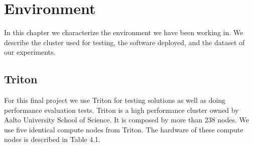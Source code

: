 \chapter{Environment}
\label{chapter:environment}

In this chapter we characterize the environment we have been working in. We describe the cluster used for testing, the software deployed, and the dataset of our experiments.

\section{Triton}

For this final project we use Triton for testing solutions as well as doing performance evaluation tests. Triton is a high performance cluster owned by Aalto University School of Science. It is composed by more than 238 nodes. We use five identical compute nodes from Triton. The hardware of these compute nodes is described in Table 4.1.  






